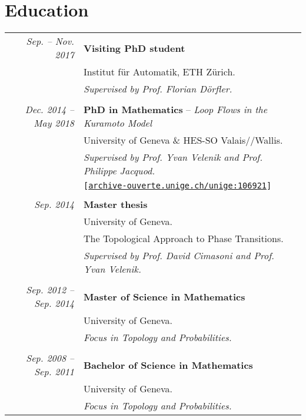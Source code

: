 \documentclass[10pt]{article}
\begin{document}
\section*{Education}
\begin{tabular}{rl}
 \textit{Sep. -- Nov. 2017} & \textbf{Visiting PhD student}\\
 & Institut f\"ur Automatik, ETH Z\"urich.\\
 & {\it Supervised by Prof. Florian D\"orfler.} \\
 &\\
 \textit{Dec. 2014 -- May 2018} & \textbf{PhD in Mathematics} -- \textit{Loop Flows in the Kuramoto Model}\\
 & University of Geneva \& HES-SO Valais//Wallis.\\
 & {\it Supervised by Prof. Yvan Velenik and Prof. Philippe Jacquod.} \\
 &{\footnotesize \tt [\url{archive-ouverte.unige.ch/unige:106921}]} \\
 &\\
 \textit{Sep. 2014} & \textbf{Master thesis}\\
 & University of Geneva.\\
 & The Topological Approach to Phase Transitions.\\
 & {\it Supervised by Prof. David Cimasoni and Prof. Yvan Velenik.} \\
 &\\
 \textit{Sep. 2012 -- Sep. 2014} & \textbf{Master of Science in Mathematics}\\
 & University of Geneva.\\
 & {\it Focus in Topology and Probabilities.} \\
 &\\
 \textit{Sep. 2008 -- Sep. 2011} & \textbf{Bachelor of Science in Mathematics}\\
 & University of Geneva.\\
 & {\it Focus in Topology and Probabilities.}
\end{tabular}
\end{document}
